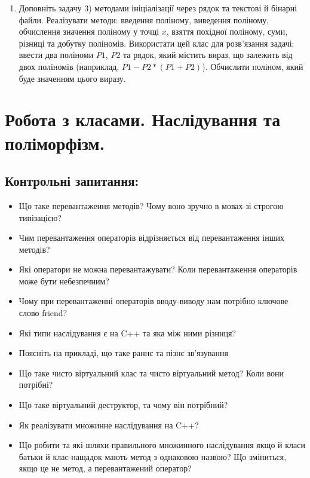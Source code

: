 \documentclass[a5paper,titlepage,openany,twoside,
]
{book_unv}%
\begin{document}
\begin{enumerate}
\def\labelenumi{\arabic{enumi})}
\setcounter{enumi}{18}
\item
Доповніть задачу 3) методами ініціалізації через рядок та текстові й бінарні файли.
Реалізувати методи: введення поліному, виведення поліному, обчислення
значення поліному у точці $x$, взяття похідної поліному, суми, різниці та
добутку поліномів. Використати цей клас для розв'язання задачі: ввести два
поліноми $P1$, $P2$ та рядок, який містить вираз, що залежить від двох
поліномів (наприклад, $P1 - P2*(P1 + P2) $). Обчислити поліном, який буде значенням цього виразу.

\end{enumerate}


\chapter{Робота з класами. Наслідування та поліморфізм.}
%

\section{Контрольні запитання:}
\begin{itemize}
\item
    Що таке перевантаження методів? Чому воно зручно в мовах зі строгою
  типізацією?
\item
  Чим перевантаження операторів відрізняється від перевантаження інших
  методів?
\item
  Які оператори не можна перевантажувати? Коли перевантаження операторів
  може бути небезпечним?
\item
  Чому при перевантаженні операторів вводу-виводу нам потрібно ключове
  слово friend?
\item
  Які типи наслідування є на C++ та яка між ними різниця?
\item
  Поясніть на прикладі, що таке раннє та пізнє зв'язування
\item
  Що таке чисто віртуальний клас та чисто віртуальний метод? Коли вони
  потрібні?
\item
  Що таке віртуальний деструктор, та чому він потрібний?
\item
  Як реалізувати множинне наслідування на C++?
\item
  Що робити та які шляхи правильного множинного наслідування якщо й
  класи батьки й клас-нащадок мають метод з однаковою назвою? Що зміниться,
  якщо це не метод, а перевантажений оператор?
\end{itemize}
\end{document}
